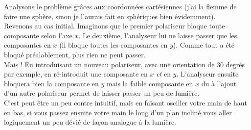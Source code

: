 \documentclass	[11pt, a4paper, openany]{book}
\begin{document}
		Analysons le problème grâces aux coordonnées cartésiennes (j'ai la flemme de faire une sphère, sinon je l'aurais fait en sphériques bien évidemment).\\
		Revenons au cas initial.  Imaginons que le premier polariseur bloque toute composante selon l'axe $x$. Le deuxième, l'analyseur lui ne laisse passer que les composantes en $x$ (il bloque toutes les composantes en $y$). Comme tout a été bloqué préalablement, plus rien ne peut passer.\\
		Mais ! En introduisant un nouveau polariseur, avec une orientation de $30$ degrés par exemple, en ré-introduit une composante en $x$ \textit{et} en $y$. L'analyseur ensuite bloquera bien la composante en $y$ mais la faible composante en $x$ du à l'ajout d'un autre polariseur permet de laisser passer un peu de lumière.\\
		
		C'est peut être un peu contre intuitif, mais en faisant osciller votre main de haut en bas, si vous passez ensuite votre main le long d'un plan incliné vous aller logiquement un peu dévié de façon analogue à la lumière.\\
		
\end{document}
